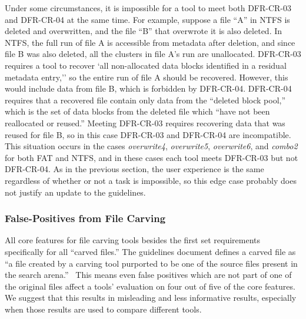 Under some circumstances, it is impossible for a tool to meet both DFR-CR-03 and DFR-CR-04 at the same time.
For example, suppose a file ``A'' in NTFS is deleted and overwritten, and the file ``B'' that overwrote it is also deleted.
In NTFS, the full run of file A is accessible from metadata after deletion, and since file B was also deleted, all the clusters in file A's run are unallocated.
DFR-CR-03 requires a tool to recover `all non-allocated data blocks identified in a residual metadata entry,''\cite{meta:dfr:standards} so the entire run of file A should be recovered.
However, this would include data from file B, which is forbidden by DFR-CR-04.
DFR-CR-04 requires that a recovered file contain only data from the ``deleted block pool,'' which is the set of data blocks from the deleted file which ``have not been reallocated or reused.''\cite{meta:dfr:standards}
Meeting DFR-CR-03 requires recovering data that was reused for file B, so in this case DFR-CR-03 and DFR-CR-04 are incompatible.
This situation occurs in the cases \emph{overwrite4}, \emph{overwrite5}, \emph{overwrite6}, and \emph{combo2} for both FAT and NTFS, and in these cases each tool meets DFR-CR-03 but not DFR-CR-04.
As in the previous section, the user experience is the same regardless of whether or not a task is impossible, so this edge case probably does not justify an update to the guidelines.



\subsubsection{False-Positives from File Carving} \label{sec:false_pos}

All core features for file carving tools besides the first set requirements specifically for all ``carved files.''
The guidelines document defines a carved file as ``a file created by a carving tool purported to be one of the source files present in the search arena.''~\cite{carving_standards}
This means even false positives which are not part of one of the original files affect a tools' evaluation on four out of five of the core features.
We suggest that this results in misleading and less informative results, especially when those results are used to compare different tools.
 
